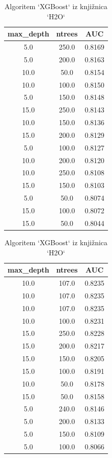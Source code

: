 \documentclass{article}
\begin{document}
\begin{table}[H]
\centering
\begin{minipage}{0.3\textwidth}
\centering
\begin{tabular}{|c|c|c|}
\hline
\textbf{max\_depth} & \textbf{ntrees} & \textbf{AUC} \\
\hline
5.0 & 250.0 & 0.8169 \\
5.0 & 200.0 & 0.8163 \\
10.0 & 50.0 & 0.8154 \\
10.0 & 100.0 & 0.8150 \\
5.0 & 150.0 & 0.8148\\
15.0 & 250.0 & 0.8143 \\
10.0 & 150.0 & 0.8136 \\
15.0 & 200.0 & 0.8129 \\
5.0 & 100.0 & 0.8127 \\
10.0 & 200.0 & 0.8120 \\
10.0 & 250.0 & 0.8108 \\
15.0 & 150.0 & 0.8103 \\
5.0 & 50.0 & 0.8074 \\
15.0 & 100.0 & 0.8072 \\
15.0 & 50.0 & 0.8044 \\
\hline
\end{tabular}
\caption{Algoritem `XGBoost` iz knjižnica `H2O`}
\end{minipage}
\hfill
\begin{minipage}{0.3\textwidth}
\centering
\begin{tabular}{|c|c|c|}
\hline
\textbf{max\_depth} & \textbf{ntrees} & \textbf{AUC} \\
\hline
10.0 & 107.0 & 0.8235 \\
10.0 & 107.0 & 0.8235 \\
10.0 & 107.0 & 0.8235 \\
10.0 & 100.0 & 0.8231 \\
15.0 & 250.0 & 0.8228 \\
15.0 & 200.0 & 0.8217 \\
15.0 & 150.0 & 0.8205 \\
15.0 & 100.0 & 0.8191 \\
10.0 & 50.0 & 0.8178 \\
15.0 & 50.0 & 0.8158 \\
5.0 & 240.0 & 0.8146 \\
5.0 & 200.0 & 0.8133 \\
5.0 & 150.0 & 0.8109 \\
5.0 & 100.0 & 0.8066 \\

\end{tabular}
\end{minipage}
\end{table}
\end{document}
